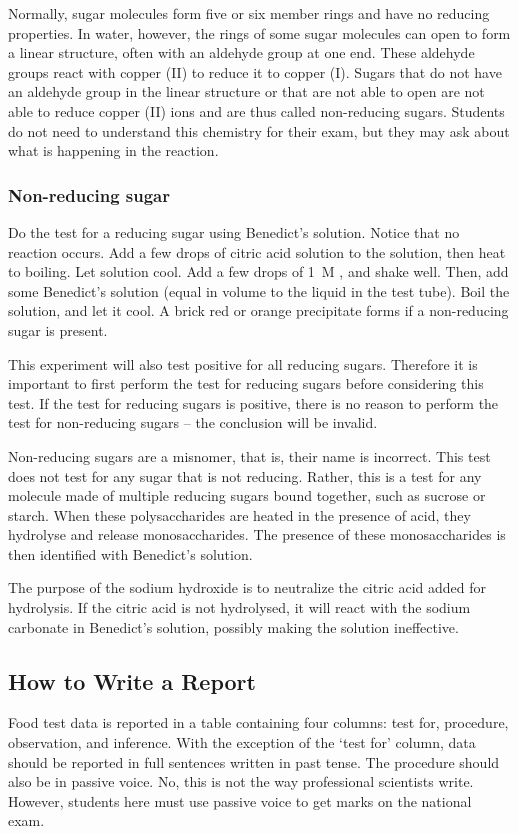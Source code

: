 \begin{itemize}
Normally, sugar molecules form five or six member rings and have no reducing properties. In water, however, the rings of some sugar molecules can open to form a linear structure, often with an aldehyde group at one end. These aldehyde groups react with copper (II) to reduce it to copper (I). Sugars that do not have an aldehyde group in the linear structure or that are not able to open are not able to reduce copper (II) ions and are thus called non-reducing sugars. Students do not need to understand this chemistry for their exam, but they may ask about what is happening in the reaction.

\subsubsection{Non-reducing sugar}
Do the test for a reducing sugar using Benedict's solution. Notice that no reaction occurs. Add a few drops of citric acid solution to the solution, then heat to boiling. Let solution cool. Add a few drops of 1~M , and shake well. Then, add some Benedict’s solution (equal in volume to the liquid in the test tube). Boil the solution, and let it cool. A brick red or orange precipitate forms if a non-reducing sugar is present.

This experiment will also test positive for all reducing sugars. Therefore it is important to first perform the test for reducing sugars before considering this test. If the test for reducing sugars is positive, there is no reason to perform the test for non-reducing sugars -- the conclusion will be invalid.

Non-reducing sugars are a misnomer, that is, their name is incorrect. This test does not test for any sugar that is not reducing. Rather, this is a test for any molecule made of multiple reducing sugars bound together, such as sucrose or starch. When these polysaccharides are heated in the presence of acid, they hydrolyse and release monosaccharides. The presence of these monosaccharides is then identified with Benedict's solution.

The purpose of the sodium hydroxide is to neutralize the citric acid added for hydrolysis. If the citric acid is not hydrolysed, it will react with the sodium carbonate in Benedict's solution, possibly making the solution ineffective.

\subsection{How to Write a Report}
Food test data is reported in a table containing four columns: test for, procedure, observation, and inference. With the exception of the `test for' column, data should be reported in full sentences written in past tense. The procedure should also be in passive voice. No, this is not the way professional scientists write. However, students here must use passive voice to get marks on the national exam.


\end{itemize}
